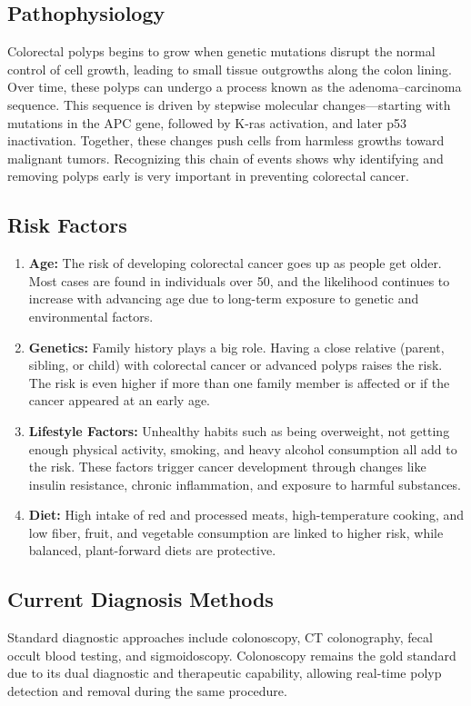 \documentclass[a4paper,12pt]{report}
\begin{document}
    \subsection{Pathophysiology}
Colorectal polyps begins to grow when genetic mutations disrupt the normal control of cell growth, leading to small tissue outgrowths along the colon lining. Over time, these polyps can undergo a process known as the adenoma–carcinoma sequence. This sequence is driven by stepwise molecular changes—starting with mutations in the APC gene, followed by K-ras activation, and later p53 inactivation. Together, these changes push cells from harmless growths toward malignant tumors. Recognizing this chain of events shows why identifying and removing polyps early is very important in preventing colorectal cancer.
  
    \subsection{Risk Factors}
\begin{enumerate}
    \item\textbf{Age:} The risk of developing colorectal cancer goes up as people get older. Most cases are found in individuals over 50, and the likelihood continues to increase with advancing age due to long-term exposure to genetic and environmental factors.
    \item\textbf{Genetics:} Family history plays a big role. Having a close relative (parent, sibling, or child) with colorectal cancer or advanced polyps raises the risk. The risk is even higher if more than one family member is affected or if the cancer appeared at an early age.
    \item\textbf{Lifestyle Factors:} Unhealthy habits such as being overweight, not getting enough physical activity, smoking, and heavy alcohol consumption all add to the risk. These factors trigger cancer development through changes like insulin resistance, chronic inflammation, and exposure to harmful substances.
    \item\textbf{Diet:} High intake of red and processed meats, high-temperature cooking, and low fiber, fruit, and vegetable consumption are linked to higher risk, while balanced, plant-forward diets are protective.
 \end{enumerate}

    \subsection{Current Diagnosis Methods}
Standard diagnostic approaches include colonoscopy, CT colonography, fecal occult blood testing, and sigmoidoscopy. Colonoscopy remains the gold standard due to its dual diagnostic and therapeutic capability, allowing real-time polyp detection and removal during the same procedure.
\end{document}
